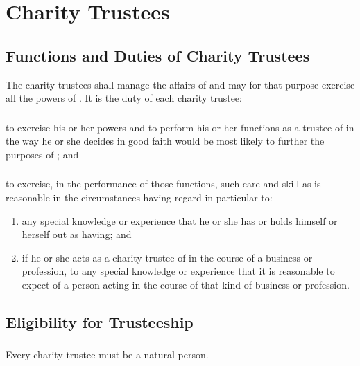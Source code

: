\section{Charity Trustees}
\label{sec:trustees}

    \subsection{Functions and Duties of Charity Trustees}\label{sec:trustee_duties}
    The charity trustees shall manage the affairs of \shortname{} and may for that purpose exercise all the powers of \shortname{}. It is the duty of each charity trustee:

        \subsubsection{}
        to exercise his or her powers and to perform his or her functions as a trustee of \shortname{} in the way he or she decides in good faith would be most likely to further the purposes of \shortname{}; and

        \subsubsection{}
        to exercise, in the performance of those functions, such care and skill as is reasonable in the circumstances having regard in particular to:
        \begin{enumerate}
            \item any special knowledge or experience that he or she has or holds himself or herself out as having; and
            \item if he or she acts as a charity trustee of \shortname{} in the course of a business or profession, to any special knowledge or experience that it is reasonable to expect of a person acting in the course of that kind of business or profession.
        \end{enumerate}

    \subsection{Eligibility for Trusteeship}\label{sec:trustee_eligibility}

        \subsubsection{}
        Every charity trustee must be a natural person.


